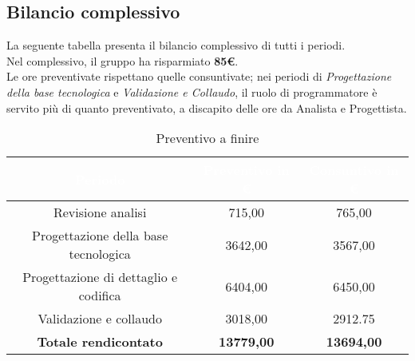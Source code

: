 \begin{flushleft}
\section{Bilancio complessivo}
	La seguente tabella presenta il bilancio complessivo di tutti i periodi.\\
	Nel complessivo, il gruppo ha risparmiato \textbf{85\euro}.\\Le ore preventivate rispettano quelle consuntivate; nei periodi di \textit{Progettazione della base tecnologica} e \textit{Validazione e Collaudo}, il ruolo di programmatore è servito più di quanto preventivato, a discapito delle ore da Analista e Progettista.
		\begin{table}[!h]
		\begin{center}
			
			
			\begin{tabular}{ccc}
				
				\rowcolor{coolblack}
				\hline
				\textcolor{white}{Periodo} & \textcolor{white}{Preventivo in \euro} & \textcolor{white}{Consuntivo in \euro}\\
				\hline
				Revisione analisi& 715,00 & 765,00 \\ 	
				Progettazione della base tecnologica& 3642,00 & 3567,00\\ 
				Progettazione di dettaglio e codifica& 6404,00   & 6450,00\\ 
				Validazione e collaudo & 3018,00 & 2912.75\\ \hline
				\textbf{Totale rendicontato}& \textbf{13779,00} & \textbf{13694,00}	\\ \hline   
				
			\end{tabular}
			\caption{Preventivo a finire} 
		\end{center}		
	\end{table}
\end{flushleft}